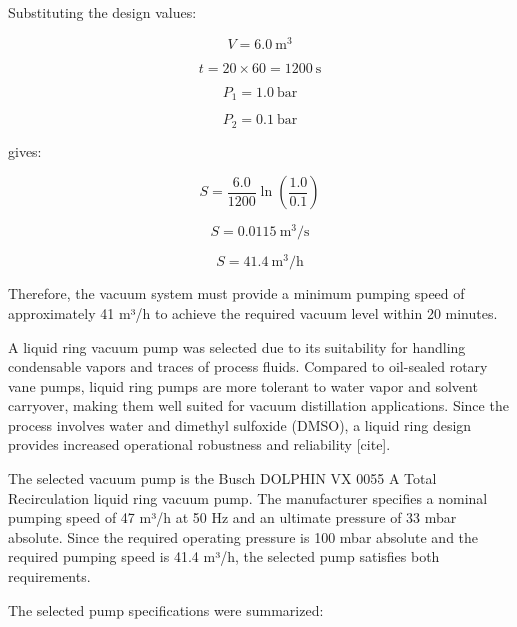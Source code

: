 Substituting the design values:

\begin{equation}{
V = 6.0\ \mathrm{m^3}
}\end{equation}

\begin{equation}{
t = 20 \times 60 = 1200\ \mathrm{s}
}\end{equation}

\begin{equation}{
P_1 = 1.0\ \mathrm{bar}
}\end{equation}

\begin{equation}{
P_2 = 0.1\ \mathrm{bar}
}\end{equation}

gives:

\begin{equation}{
S=\frac{6.0}{1200}\ln\left(\frac{1.0}{0.1}\right)
}\end{equation}

\begin{equation}{
S=0.0115\ \mathrm{m^3/s}
}\end{equation}

\begin{equation}{
S=41.4\ \mathrm{m^3/h}
}\end{equation}

Therefore, the vacuum system must provide a minimum pumping speed of
approximately 41 m³/h to achieve the required vacuum level within 20
minutes.

A liquid ring vacuum pump was selected due to its suitability for
handling condensable vapors and traces of process fluids. Compared to
oil-sealed rotary vane pumps, liquid ring pumps are more tolerant to
water vapor and solvent carryover, making them well suited for vacuum
distillation applications. Since the process involves water and dimethyl
sulfoxide (DMSO), a liquid ring design provides increased operational
robustness and reliability {[}cite{]}.

The selected vacuum pump is the Busch DOLPHIN VX 0055 A Total
Recirculation liquid ring vacuum pump. The manufacturer specifies a
nominal pumping speed of 47 m³/h at 50 Hz and an ultimate pressure of 33
mbar absolute. Since the required operating pressure is 100 mbar
absolute and the required pumping speed is 41.4 m³/h, the selected pump
satisfies both requirements.

The selected pump specifications were summarized:


